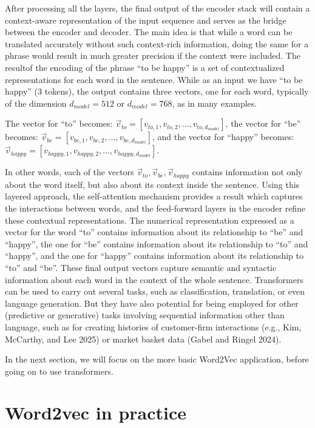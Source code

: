After processing all the layers, the final output of the encoder
stack will contain a context-aware representation of the input sequence
and serves as the bridge between the encoder and decoder. The main idea
is that while a word can be translated accurately without such
context-rich information, doing the same for a phrase would result in much greater precision if the context were included. The resultof the
encoding of the phrase ``to be happy'' is a set of contextualized
representations for each word in the sentence. While as an
input we have ``to be happy'' (3 tokens), the output contains three
vectors, one for each word, typically of the dimension \(d_{model}=512\) or
\(d_{model}=768\), as in many examples.

The vector for ``to'' becomes:
\(\vec{v}_{to} = [v_{to,1}, v_{to,2}, \ldots, v_{to,d_{model}}]\), the
vector for ``be'' becomes:
\(\vec{v}_{be} = [ v_{be,1}, v_{be,2}, \ldots, v_{be,d_{model}}]\), and
the vector for ``happy'' becomes:
\(\vec{v}_{happy} = [ v_{happy,1}, v_{happy,2}, \ldots, v_{happy,d_{model}}]\).

In other words, each of the vectors
\(\vec{v}_{to}, \vec{v}_{be}, \vec{v}_{happy}\) contains information not
only about the word itself, but also about its context inside the
sentence. Using this layered approach, the self-attention mechanism provides
a result which captures the interactions between words, and the feed-forward
layers in the encoder refine these contextual representations. The
numerical representation expressed as a vector for the word ``to''
contains information about its relationship to ``be'' and ``happy'', the
one for ``be'' contains information about its relationship to ``to'' and
``happy'', and the one for ``happy'' contains information about its
relationship to ``to'' and ``be''. These final output vectors capture
semantic and syntactic information about each word in the context of the
whole sentence. Transformers can be used to carry out several tasks,
such as classification, translation, or even language generation. But
they have also potential for being employed for other (predictive or
generative) tasks involving sequential information other than language,
such as for creating histories of customer-firm interactions (e.g., Kim, McCarthy,
and Lee 2025) or market basket data (Gabel and Ringel 2024).

In the next section, we will focus on the more basic Word2Vec
application, before going on to use transformers.

\section{Word2vec in practice}\label{word2vec-in-practice}

